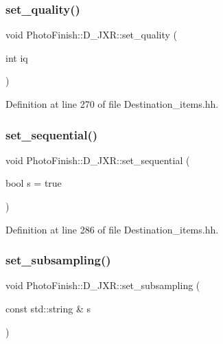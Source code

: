 \subsubsection{\texorpdfstring{set\+\_\+quality()}{set\_quality()}}
{\footnotesize\ttfamily void Photo\+Finish\+::\+D\+\_\+\+J\+X\+R\+::set\+\_\+quality (\begin{DoxyParamCaption}\item[{int}]{iq }\end{DoxyParamCaption})\hspace{0.3cm}{\ttfamily [inline]}}



Definition at line 270 of file Destination\+\_\+items.\+hh.

\mbox{\label{class_photo_finish_1_1_d___j_x_r_ac75c9944df3a37f18b9f3696b4d00ae3}} 
\subsubsection{\texorpdfstring{set\+\_\+sequential()}{set\_sequential()}}
{\footnotesize\ttfamily void Photo\+Finish\+::\+D\+\_\+\+J\+X\+R\+::set\+\_\+sequential (\begin{DoxyParamCaption}\item[{bool}]{s = {\ttfamily true} }\end{DoxyParamCaption})\hspace{0.3cm}{\ttfamily [inline]}}



Definition at line 286 of file Destination\+\_\+items.\+hh.

\mbox{\label{class_photo_finish_1_1_d___j_x_r_af48c6364eef8d653066d9099566e167d}} 
\subsubsection{\texorpdfstring{set\+\_\+subsampling()}{set\_subsampling()}}
{\footnotesize\ttfamily void Photo\+Finish\+::\+D\+\_\+\+J\+X\+R\+::set\+\_\+subsampling (\begin{DoxyParamCaption}\item[{const std\+::string \&}]{s }\end{DoxyParamCaption})\hspace{0.3cm}{\ttfamily [inline]}}



